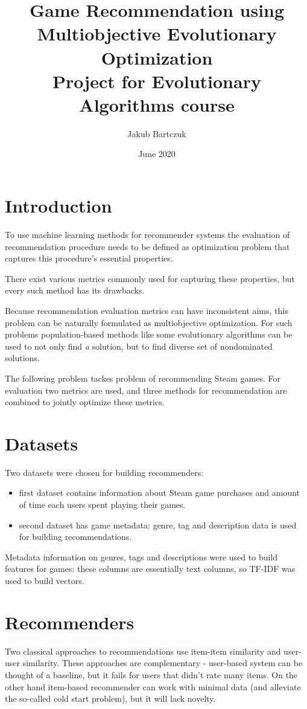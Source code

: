 \documentclass{article}
\title{
  Game Recommendation using Multiobjective Evolutionary Optimization \\
  \large Project for Evolutionary Algorithms course
}
\author{Jakub Bartczuk}
\date{June 2020}
\begin{document}
\maketitle
\section{Introduction}

To use machine learning methods for recommender systems the evaluation of recommendation procedure needs to be defined as optimization problem that captures this procedure's essential properties.

There exist various metrics commonly used for capturing these properties, but every such method has its drawbacks.

Because recommendation evaluation metrics can have inconsistent aims, this problem can be naturally formulated as multiobjective optimization. For such problems population-based methods like some evolutionary algorithms can be used to not only find \textit{a} solution, but to find diverse set of nondominated solutions. 

The following problem tackes problem of recommending Steam games. For evaluation two metrics are used, and three methods for recommendation are combined to jointly optimize these metrics.

\section{Datasets}

Two datasets were chosen for building recommenders:

\begin{itemize}
\item first dataset contains information about Steam game purchases and amount of time each users spent playing their games.
\item second dataset has game metadata: genre, tag and description data is used for building recommendations.
\end{itemize}

Metadata information on genres, tags and descriptions were used to build features for games: these columns are essentially text columns, so TF-IDF was used to build vectors. 

\section{Recommenders}

Two classical approaches to recommendations use item-item similarity and user-user similarity. These approaches are complementary - user-based system can be thought of a baseline, but it fails for users that didn't rate many items. On the other hand item-based recommender can work with minimal data (and alleviate the so-called cold start problem), but it will lack novelty.
\end{document}
